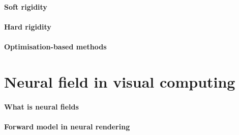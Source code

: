\paragraph{Soft rigidity}
\paragraph{Hard rigidity}
\paragraph{Optimisation-based methods}

\section{Neural field in visual computing}
\paragraph{What is neural fields}
\paragraph{Forward model in neural rendering}